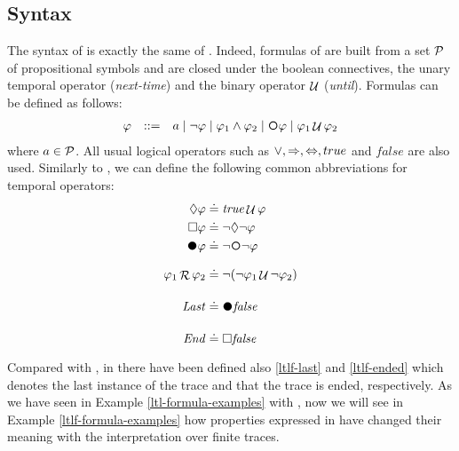 \subsection{Syntax}
The syntax of \LTLf is exactly the same of \LTL. Indeed, formulas of \LTLf are built from a set $\P$ of propositional symbols and are closed under the boolean connectives, the unary temporal operator \Next (\emph{next-time}) and the binary operator $\lUntil$ (\emph{until}). Formulas can be defined as follows:
\[\begin{array}{rcl}
\varphi &::=& a \mid \lnot \varphi \mid \varphi_1\land \varphi_2 \mid \Next\varphi \mid \varphi_1 \lUntil \varphi_2
\end{array}
\]
where $a\in \P$. All usual logical operators such as $\lOR, \Rightarrow, \Leftrightarrow, true$ and $false$ are also used. Similarly to \LTL, we can define the following common abbreviations for temporal operators:
\begin{align}
\Diamond\varphi &\doteq \true\lUntil\varphi \label{ltlf-eve}\\
\Box\varphi &\doteq\lnot\Diamond\lnot\varphi \label{ltlf-alw}\\
\Wnext \varphi &\doteq \lnot \Next \lnot \varphi \label{ltlf-wn}\\
\varphi_1 \Release \varphi_2 &\doteq \lnot (\lnot \varphi_1 \lUntil \lnot \varphi_2) \label{ltlf-release}\\
\Last &\doteq \Wnext\false \label{ltlf-last}\\
\Ended &\doteq \Box\false \label{ltlf-ended}
\end{align}
Compared with \LTL, in \LTLf there have been defined also \ref{ltlf-last} and \ref{ltlf-ended} which denotes the last instance of the trace and that the trace is ended, respectively.
As we have seen in Example \ref{ltl-formula-examples} with \LTL, now we will see in Example \ref{ltlf-formula-examples} how properties expressed in \LTLf have changed their meaning with the interpretation over finite traces.
